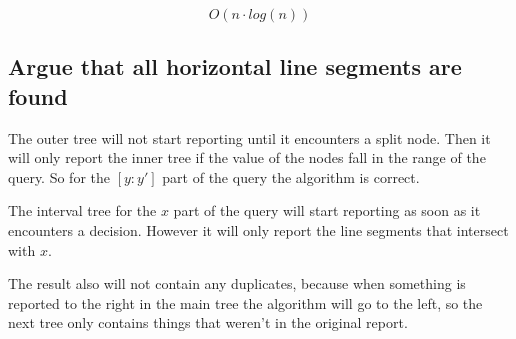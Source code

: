 \documentclass{article}
\begin{document}
\[ O(n \cdot log(n))\]


\subsection{Argue that all horizontal line segments are found}
The outer tree will not start reporting until it encounters a
split node. Then it will only report the inner tree if the
value of the nodes fall in the range of the query. So for
the $[y:y']$ part of the query the algorithm is correct.

The interval tree for the $x$ part of the query will start
reporting as soon as it encounters a decision. However it
will only report the line segments that intersect with $x$.

The result also will not contain any duplicates, because
when something is reported to the right in the main tree
the algorithm will go to the left, so the next tree only
contains things that weren't in the original report.

\newpage
\end{document}
